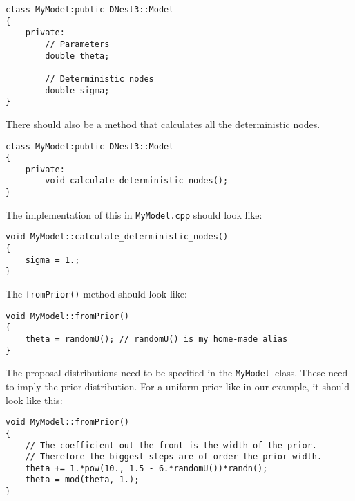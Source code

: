 \documentclass[letterpaper, 11pt]{article}
\newcommand{\mymodel}{{\tt MyModel}}
\begin{document}
\begin{verbatim}
class MyModel:public DNest3::Model
{
    private:
        // Parameters
        double theta;

        // Deterministic nodes
        double sigma;
}
\end{verbatim}

There should also be a method that calculates all the deterministic nodes.
\begin{verbatim}
class MyModel:public DNest3::Model
{
    private:
        void calculate_deterministic_nodes();
}
\end{verbatim}
The implementation of this in \mymodel{\tt.cpp} should look like:
\begin{verbatim}
void MyModel::calculate_deterministic_nodes()
{
    sigma = 1.;
}
\end{verbatim}
The {\tt fromPrior()} method should look like:
\begin{verbatim}
void MyModel::fromPrior()
{
    theta = randomU(); // randomU() is my home-made alias
}
\end{verbatim}
The proposal distributions need to be specified in the \mymodel~class.
These need to imply the prior distribution. For a uniform prior like in our
example, it should look like this:
\begin{verbatim}
void MyModel::fromPrior()
{
    // The coefficient out the front is the width of the prior.
    // Therefore the biggest steps are of order the prior width.
    theta += 1.*pow(10., 1.5 - 6.*randomU())*randn();
    theta = mod(theta, 1.);
}
\end{verbatim}
\end{document}
